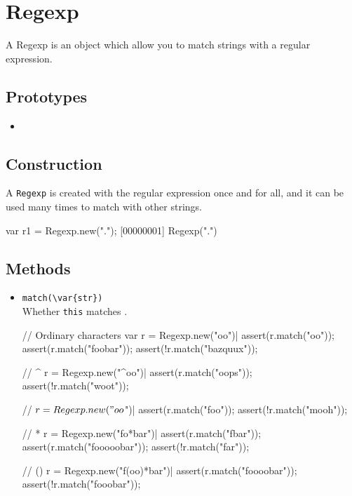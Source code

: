 \section{Regexp}

A Regexp is an object which allow you to match strings with a regular
expression.

\subsection{Prototypes}
\begin{itemize}
\item {}
\end{itemize}

\subsection{Construction}
\label{stdlib:tag:ctor}

A \lstinline{Regexp} is created with the regular expression once and for all, and
it can be used many times to match with other strings.

\begin{urbiscript}
var r1 = Regexp.new(".");
[00000001] Regexp(".")
\end{urbiscript}

\subsection{Methods}
\begin{itemize}
\item \lstinline|match(\var{str})|\\
  Whether \lstinline|this| matches .
\begin{urbiscript}
// Ordinary characters
var r = Regexp.new("oo")|
assert(r.match("oo"));
assert(r.match("foobar"));
assert(!r.match("bazquux"));

// ^
r = Regexp.new("^oo")|
assert(r.match("oops"));
assert(!r.match("woot"));

// $
r = Regexp.new("oo$")|
assert(r.match("foo"));
assert(!r.match("mooh"));

// *
r = Regexp.new("fo*bar")|
assert(r.match("fbar"));
assert(r.match("fooooobar"));
assert(!r.match("far"));

// ()
r = Regexp.new("f(oo)*bar")|
assert(r.match("foooobar"));
assert(!r.match("fooobar"));
\end{urbiscript}



\end{itemize}

